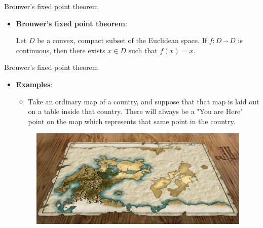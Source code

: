 \documentclass{beamer}
\begin{document}
\begin{frame}[fragile]{Brouwer’s fixed point theorem}
	\begin{itemize}
		\item \textbf{\large Brouwer’s fixed point theorem}:
		
		\qquad Let $D$ be a convex, compact subset of the Euclidean space. If $f : D\  \overrightarrow{}\ D$ is
		continuous, then there exists $x \in D$ such that $f (x) = x$.
	\end{itemize}
\end{frame}

\begin{frame}[fragile]{Brouwer’s fixed point theorem}
	\begin{itemize}
		\item \textbf{Examples}:
		\begin{itemize}
			\item Take an ordinary map of a country, and suppose that that map is laid out on a table inside that country. There will always be a "You are Here" point on the map which represents that same point in the country.
		\end{itemize}
		\begin{figure}[H]
			\centering
			\includegraphics[width=0.7\linewidth]{001.jpg}\vspace{-10pt}
			\nonumber\vspace{-10pt}
		\end{figure}
	\end{itemize}
\end{frame}
\end{document}
